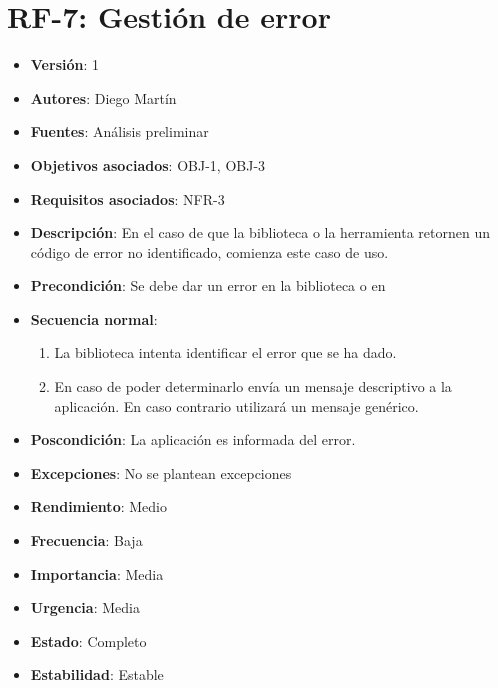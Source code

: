\documentclass[letterpaper,10pt,spanish]{sphinxmanual}
\begin{document}
\section{RF-7: Gestión de error}
\label{analysis/fr:rf-7-gestion-de-error}\begin{itemize}
\item {} 
\textbf{Versión}: 1

\item {} 
\textbf{Autores}: Diego Martín

\item {} 
\textbf{Fuentes}: Análisis preliminar

\item {} 
\textbf{Objetivos asociados}: OBJ-1, OBJ-3

\item {} 
\textbf{Requisitos asociados}: NFR-3

\item {} 
\textbf{Descripción}: En el caso de que la biblioteca o la herramienta  retornen un código de error no identificado, comienza este caso de uso.

\item {} 
\textbf{Precondición}: Se debe dar un error en la biblioteca o en 

\item {} 
\textbf{Secuencia normal}:
\begin{enumerate}
\item {} 
La biblioteca intenta identificar el error que se ha dado.

\item {} 
En caso de poder determinarlo envía un mensaje descriptivo a la aplicación. En caso contrario utilizará un mensaje genérico.

\end{enumerate}

\item {} 
\textbf{Poscondición}: La aplicación es informada del error.

\item {} 
\textbf{Excepciones}: No se plantean excepciones

\item {} 
\textbf{Rendimiento}: Medio

\item {} 
\textbf{Frecuencia}: Baja

\item {} 
\textbf{Importancia}: Media

\item {} 
\textbf{Urgencia}: Media

\item {} 
\textbf{Estado}: Completo

\item {} 
\textbf{Estabilidad}: Estable

\end{itemize}
\end{document}

